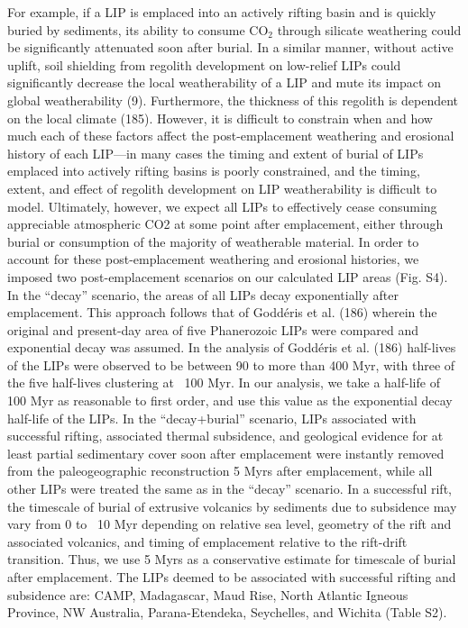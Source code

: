 \documentclass[11pt,letterpaper]{article}
\begin{document}
For example, if a LIP is emplaced into an actively rifting basin and is quickly buried by sediments, its ability to consume CO$_2$ through silicate weathering could be significantly attenuated soon after burial. In a similar manner, without active uplift, soil shielding from regolith development on low-relief LIPs could significantly decrease the local weatherability of a LIP and mute its impact on global weatherability (9). Furthermore, the thickness of this regolith is dependent on the local climate (185). However, it is difficult to constrain when and how much each of these factors affect the post-emplacement weathering and erosional history of each LIP—in many cases the timing and extent of burial of LIPs emplaced into actively rifting basins is poorly constrained, and the timing, extent, and effect of regolith development on LIP weatherability is difficult to model. Ultimately, however, we expect all LIPs to effectively cease consuming appreciable atmospheric CO2 at some point after emplacement, either through burial or consumption of the majority of weatherable material.
In order to account for these post-emplacement weathering and erosional histories, we imposed two post-emplacement scenarios on our calculated LIP areas (Fig. S4). In the “decay” scenario, the areas of all LIPs decay exponentially after emplacement. This approach follows that of Goddéris et al. (186) wherein the original and present-day area of five Phanerozoic LIPs were compared and exponential decay was assumed. In the analysis of Goddéris et al. (186) half-lives of the LIPs were observed to be between 90 to more than 400 Myr, with three of the five half-lives clustering at ~100 Myr. In our analysis, we take a half-life of 100 Myr as reasonable to first order, and use this value as the exponential decay half-life of the LIPs. In the “decay+burial” scenario, LIPs associated with successful rifting, associated thermal subsidence, and geological evidence for at least partial sedimentary cover soon after emplacement were instantly removed from the paleogeographic reconstruction 5 Myrs after emplacement, while all other LIPs were treated the same as in the “decay” scenario. In a successful rift, the timescale of burial of extrusive volcanics by sediments due to subsidence may vary from 0 to ~10 Myr depending on relative sea level, geometry of the rift and associated volcanics, and timing of emplacement relative to the rift-drift transition. Thus, we use 5 Myrs as a conservative estimate for timescale of burial after emplacement. The LIPs deemed to be associated with successful rifting and subsidence are: CAMP, Madagascar, Maud Rise, North Atlantic Igneous Province, NW Australia, Parana-Etendeka, Seychelles, and Wichita (Table S2).
\end{document}
